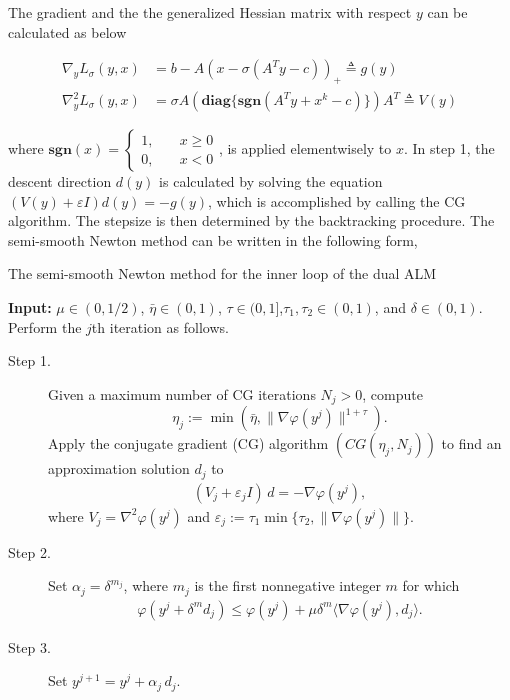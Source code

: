 \documentclass[a4paper]{article}
\begin{document}
The gradient and the the generalized Hessian matrix with respect $y$ can be calculated as below 

\begin{equation}
\begin{aligned}
\nabla_y L_\sigma(y, x) &= b - A(x - \sigma(A^Ty - c))_+ \triangleq g(y)\\
\nabla_y^2 L_\sigma(y, x) &= \sigma A \left( \mathbf{diag}\{ \mathbf{sgn}(A^Ty + x^k -c) \} \right)  A^T  \triangleq V(y)
\end{aligned}
\end{equation}

where $ \mathbf{sgn}(x) = \left\{
\begin{aligned}
1, & \quad x \geq 0 \\
0, & \quad x < 0 
\end{aligned} \right.$, is applied elementwisely to $x$. In step 1, the descent direction $d(y)$ is calculated by solving the equation $(V(y) + \varepsilon I)d(y) = -g(y)$, which is accomplished by calling the CG algorithm. The stepsize is then determined by the backtracking procedure. The semi-smooth Newton method can be written in the following form\cite{zhao}, \\

\begin{algorithm}[H]
	\caption{The semi-smooth Newton method for the inner loop of the dual ALM}
	\textbf{Input:} $\mu \in (0, 1/2)$, $\bar{\eta} \in (0, 1)$, $\tau \in (0,1]$,$\tau_1, \tau_2\in (0,1)$, and $\delta \in (0, 1)$. Perform the $j$th iteration as follows.
	\begin{description}
		\item[Step 1.] Given a maximum number of CG iterations $N_j>0$, compute \[ \eta_j := \min(\bar{\eta}, \| \nabla \varphi(y^j)\|^{1+\tau}).\]
		Apply the conjugate gradient (CG) algorithm $(CG(\eta_j, N_j))$ to find an approximation solution $d_j$ to
		\begin{eqnarray}\label{eqn-epsk}
		(V_j + \varepsilon_j I) \, d= -\nabla \varphi(y^j) ,
		\end{eqnarray}
		where $V_j = \nabla^2\varphi(y^j)$ and $\varepsilon_j := \tau_1 \min\{\tau_2, \|\nabla \varphi(y^j)\|\}$.
		
		\item[Step 2.]  Set $\alpha_j = \delta^{m_j}$, where $m_j$ is the first nonnegative integer $m$ for which
		\begin{eqnarray}\label{Armijo}
		\varphi(y^j + \delta^{m} d_j) \leq \varphi(y^j) + \mu \delta^{m}
		\langle \nabla \varphi(y^j), d_j \rangle.
		\end{eqnarray}
		\item[Step 3.] Set $y^{j+1} = y^j + \alpha_j \, d_j$.
	\end{description}
\end{algorithm}
\end{document}
